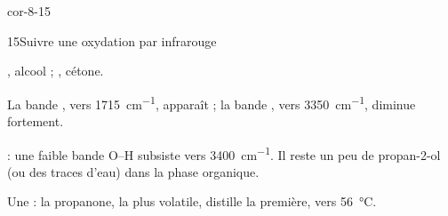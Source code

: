 \begin{blocLivre}{cor-8-15}
\begin{corrige}{15}{Suivre une oxydation par infrarouge}
\begin{questions}
\item {}, alcool ; , cétone.
\item La bande , vers \qty{1715}{cm^{-1}}, apparaît ; la bande , vers \qty{3350}{cm^{-1}}, diminue fortement.
\item {} : une faible bande O--H subsiste vers \qty{3400}{cm^{-1}}. Il reste un peu de propan-2-ol (ou des traces d'eau) dans la
phase organique.
\item Une  : la propanone, la plus volatile, distille la première, vers \qty{56}{\degreeCelsius}.
\end{questions}
\end{corrige}
\end{blocLivre}

